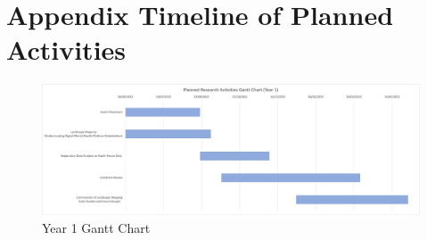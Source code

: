 \documentclass[12pt]{article}
\begin{document}
\section{Appendix Timeline of Planned Activities}
\begin{landscape}
\begin{figure}[h]
    \centering
    \includegraphics[scale=.6]{Images/Gantt Chart Image.png}
    \caption{Year 1 Gantt Chart}
    \label{Year 1 Gantt Chart}
\end{figure}
\end{landscape}
\end{document}
